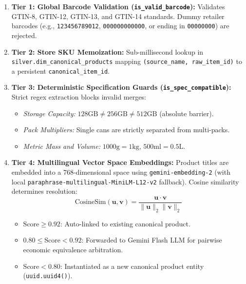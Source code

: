 \documentclass[11pt,a4paper]{article}
\begin{document}
\begin{enumerate}
    \item \textbf{Tier 1: Global Barcode Validation (\texttt{is\_valid\_barcode}):}
        Validates GTIN-8, GTIN-12, GTIN-13, and GTIN-14 standards. Dummy retailer barcodes (e.g., \texttt{123456789012}, \texttt{000000000000}, or ending in \texttt{00000000}) are rejected.
    \item \textbf{Tier 2: Store SKU Memoization:}
        Sub-millisecond lookup in \texttt{silver.dim\_canonical\_products} mapping \texttt{(source\_name, raw\_item\_id)} to a persistent \texttt{canonical\_item\_id}.
    \item \textbf{Tier 3: Deterministic Specification Guards (\texttt{is\_spec\_compatible}):}
        Strict regex extraction blocks invalid merges:
        \begin{itemize}[noitemsep]
            \item \textit{Storage Capacity:} $128\text{GB} \neq 256\text{GB} \neq 512\text{GB}$ (absolute barrier).
            \item \textit{Pack Multipliers:} Single cans are strictly separated from multi-packs.
            \item \textit{Metric Mass and Volume:} $1000\text{g} = 1\text{kg}$, $500\text{ml} = 0.5\text{L}$.
        \end{itemize}
    \item \textbf{Tier 4: Multilingual Vector Space Embeddings:}
        Product titles are embedded into a 768-dimensional space using \texttt{gemini-embedding-2} (with local \texttt{paraphrase-multilingual-MiniLM-L12-v2} fallback). Cosine similarity determines resolution:
        $$\text{CosineSim}(\mathbf{u}, \mathbf{v}) = \frac{\mathbf{u} \cdot \mathbf{v}}{\|\mathbf{u}\|_2 \|\mathbf{v}\|_2}$$
        \begin{itemize}[noitemsep]
            \item $\text{Score} \ge 0.92$: Auto-linked to existing canonical product.
            \item $0.80 \le \text{Score} < 0.92$: Forwarded to Gemini Flash LLM for pairwise economic equivalence arbitration.
            \item $\text{Score} < 0.80$: Instantiated as a new canonical product entity (\texttt{uuid.uuid4()}).
        \end{itemize}
\end{enumerate}
\end{document}
